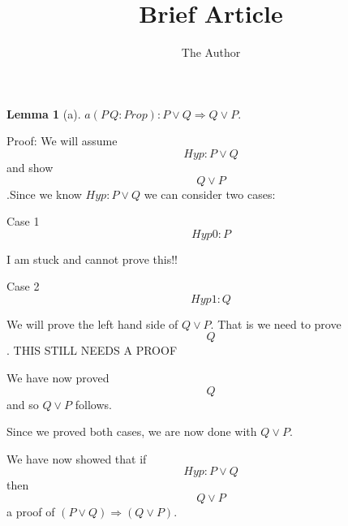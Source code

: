 \documentclass[11pt, oneside]{article}
\title{Brief Article}
\author{The Author}
\date{}							%
\newtheorem{Lemma}{Lemma}
\begin{document}
\maketitle

\begin{Lemma}[a] \label{Lemma:a}
$a(P\,Q:Prop):P\lor Q\Rightarrow Q\lor P.$
 \end{Lemma}


 Proof: We will assume $$Hyp : P \lor Q $$ and show $$Q \lor P $$.Since we know $Hyp : P \lor Q $ we can consider two cases: 

 Case 1 $$Hyp0 : P $$

 {\color{red}I am stuck and cannot prove this!!}

 

 Case 2 $$Hyp1 : Q $$

 We will prove the left hand side of $Q \lor P $. That is we need to prove $$Q $$.{\color{red} THIS STILL NEEDS A PROOF}

 We have now proved $$Q $$ and so $Q \lor P $ follows.

 Since we proved both cases, we are now done with $Q \lor P $.

 We have now showed that if $$Hyp : P \lor Q $$ then $$Q \lor P $$ a proof of $(P \lor Q) \Rightarrow (Q \lor P) $.
\end{document}
